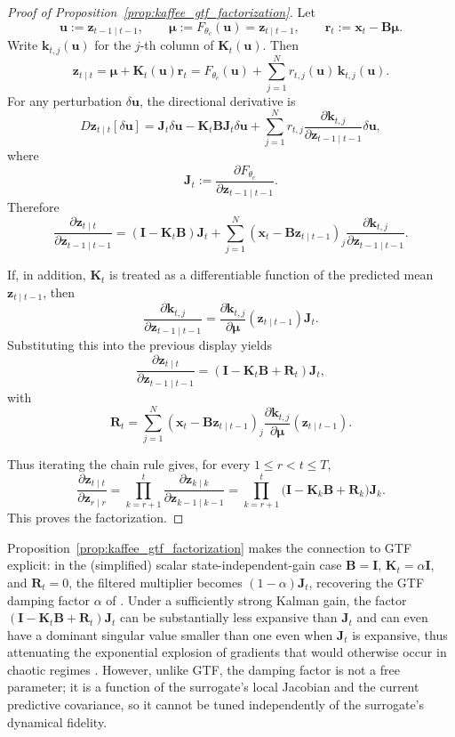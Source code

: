 \documentclass{article}
\theoremstyle{plain}
\theoremstyle{definition}
\theoremstyle{remark}
\begin{document}
\begin{proof}[Proof of Proposition~\ref{prop:kaffee_gtf_factorization}]
Let
\[
\bm u:=\bm z_{t-1\mid t-1},\qquad
\bm\mu:=F_{\theta_c}(\bm u)=\bm z_{t\mid t-1},
\qquad
\bm r_t:=\bm x_t-\bm B\bm\mu .
\]
Write  $\bm k_{t,j}(\bm u) $ for the  $j $-th column of
 $\bm K_t(\bm u) $. Then
\[
\bm z_{t\mid t}
=
\bm\mu+\bm K_t(\bm u)\bm r_t
=
F_{\theta_c}(\bm u)
+
\sum_{j=1}^N r_{t,j}(\bm u)\,\bm k_{t,j}(\bm u).
\]
For any perturbation  $\delta\bm u $, the directional derivative is
\[
D\bm z_{t\mid t}[\delta\bm u]
=
\bm J_t\delta\bm u
-
\bm K_t\bm B\bm J_t\delta\bm u
+
\sum_{j=1}^N
r_{t,j}
\frac{\partial \bm k_{t,j}}{\partial \bm z_{t-1\mid t-1}}
\delta\bm u,
\]
where
\[
\bm J_t:=\frac{\partial F_{\theta_c}}{\partial \bm z_{t-1\mid t-1}} .
\]
Therefore
\[
\frac{\partial \bm z_{t\mid t}}{\partial \bm z_{t-1\mid t-1}}
=
(\bm I-\bm K_t\bm B)\bm J_t
+
\sum_{j=1}^N
(\bm x_t-\bm B\bm z_{t\mid t-1})_j
\frac{\partial \bm k_{t,j}}{\partial \bm z_{t-1\mid t-1}}.
\]

If, in addition,  $\bm K_t $ is treated as a differentiable function of the
predicted mean  $\bm z_{t\mid t-1} $, then
\[
\frac{\partial \bm k_{t,j}}{\partial \bm z_{t-1\mid t-1}}
=
\frac{\partial \bm k_{t,j}}{\partial \bm \mu}(\bm z_{t\mid t-1})\bm J_t.
\]
Substituting this into the previous display yields
\[
\frac{\partial \bm z_{t\mid t}}{\partial \bm z_{t-1\mid t-1}}
=
(\bm I-\bm K_t\bm B+\bm R_t)\bm J_t,
\]
with
\[
\bm R_t
=
\sum_{j=1}^N
(\bm x_t-\bm B\bm z_{t\mid t-1})_j
\frac{\partial \bm k_{t,j}}{\partial \bm \mu}(\bm z_{t\mid t-1}).
\]

Thus iterating the chain rule gives, for every $1\le r<t\le T$,
\[
\frac{\partial \bm z_{t\mid t}}{\partial \bm z_{r\mid r}}
=
\prod_{k=r+1}^{t}
\frac{\partial \bm z_{k\mid k}}{\partial \bm z_{k-1\mid k-1}}
=
\prod_{k=r+1}^{t}
\big(\bm I-\bm K_k\bm B+\bm R_k\big)\bm J_k .
\]
This proves the factorization.

\end{proof}
Proposition~\ref{prop:kaffee_gtf_factorization} makes the connection to GTF explicit: in the (simplified) scalar state-independent-gain case $\bm B=\bm I$, $\bm K_t=\alpha\bm I$, and $\bm R_t=0$, the filtered multiplier becomes $(1-\alpha)\bm J_t$, recovering the GTF damping factor $\alpha$ of \citet{hess2023generalized}. Under a sufficiently strong Kalman gain, the factor
$(\bm I-\bm K_t\bm B+\bm R_t)\bm J_t$ can be substantially less expansive than $\bm J_t$ and can even have a dominant singular value smaller than one even when $\bm J_t$ is expansive, thus attenuating the exponential explosion of gradients that would otherwise occur in chaotic regimes \citep{mikhaeil2022difficulty}. However, unlike GTF, the damping factor is not a free parameter; it is a function of the surrogate's local Jacobian and the current predictive covariance, so it cannot be tuned independently of the surrogate's dynamical fidelity. 
\end{document}
